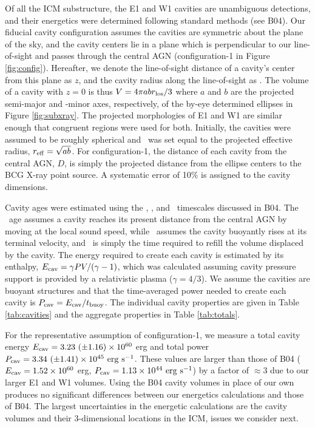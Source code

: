 \documentclass[iop]{emulateapj}
\begin{document}
Of all the ICM substructure, the E1 and W1 cavities are unambiguous
detections, and their energetics were determined following standard
methods (see B04). Our fiducial cavity configuration assumes the
cavities are symmetric about the plane of the sky, and the cavity
centers lie in a plane which is perpendicular to our line-of-sight and
passes through the central AGN (configuration-1 in Figure
\ref{fig:config}). Hereafter, we denote the line-of-sight distance of
a cavity's center from this plane as $z$, and the cavity radius along
the line-of-sight as \rlos. The volume of a cavity with $z = 0$ is
thus $V = 4\pi a b r_{\rm{los}}/3$ where $a$ and $b$ are the projected
semi-major and -minor axes, respectively, of the by-eye determined
ellipses in Figure \ref{fig:subxray}. The projected morphologies of E1
and W1 are similar enough that congruent regions were used for
both. Initially, the cavities were assumed to be roughly spherical and
\rlos\ was set equal to the projected effective radius, $r_{\rm{eff}} =
\sqrt{ab}$. For configuration-1, the distance of each cavity from the
central AGN, $D$, is simply the projected distance from the ellipse
centers to the BCG X-ray point source. A systematic error of 10\% is
assigned to the cavity dimensions.

Cavity ages were estimated using the \tsonic, \tbuoy, and
\trefill\ timescales discussed in B04. The \tsonic\ age assumes a
cavity reaches its present distance from the central AGN by moving at
the local sound speed, while \tbuoy\ assumes the cavity buoyantly
rises at its terminal velocity, and \trefill\ is simply the time
required to refill the volume displaced by the cavity. The energy
required to create each cavity is estimated by its enthalpy, $E_{\rm{cav}} =
\gamma PV/(\gamma-1)$, which was calculated assuming cavity pressure
support is provided by a relativistic plasma ($\gamma = 4/3$). We
assume the cavities are buoyant structures and that the time-averaged
power needed to create each cavity is $P_{\rm{cav}} = E_{\rm{cav}}/t_{\rm{buoy}}$. The
individual cavity properties are given in Table \ref{tab:cavities} and
the aggregate properties in Table \ref{tab:totals}.

For the representative assumption of configuration-1, we measure a
total cavity energy $E_{\rm{cav}} = 3.23 ~(\pm 1.16) \times 10^{60}$ erg and
total power $P_{\rm{cav}} = 3.34 ~(\pm 1.41) \times 10^{45} ~\rm{\mbox{\ensuremath{\rm{erg}}}~\ensuremath{\rm{\mbox{\ensuremath{\rm{s}}}^{-1}}}}$. These
values are larger than those of B04 ($E_{\rm{cav}} = 1.52 \times 10^{60}$
erg, $P_{\rm{cav}} = 1.13 \times 10^{44} ~\rm{\mbox{\ensuremath{\rm{erg}}}~\ensuremath{\rm{\mbox{\ensuremath{\rm{s}}}^{-1}}}}$) by a factor of $\approx 3$
due to our larger E1 and W1 volumes. Using the B04 cavity volumes in
place of our own produces no significant differences between our
energetics calculations and those of B04. The largest uncertainties in
the energetic calculations are the cavity volumes and their
3-dimensional locations in the ICM, issues we consider next.
\end{document}
